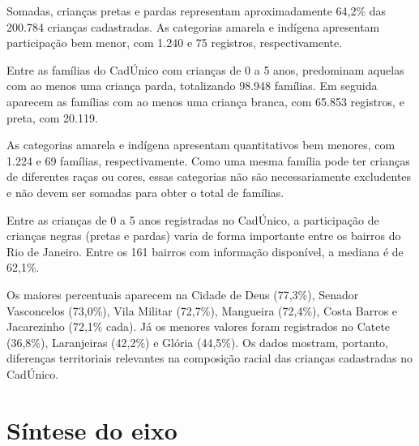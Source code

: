 Somadas, crianças pretas e pardas representam aproximadamente 64,2\% das 200.784 crianças cadastradas. As categorias amarela e indígena apresentam participação bem menor, com 1.240 e 75 registros, respectivamente.


Entre as famílias do CadÚnico com crianças de 0 a 5 anos, predominam aquelas com ao menos uma criança parda, totalizando 98.948 famílias. Em seguida aparecem as famílias com ao menos uma criança branca, com 65.853 registros, e preta, com 20.119.

As categorias amarela e indígena apresentam quantitativos bem menores, com 1.224 e 69 famílias, respectivamente. Como uma mesma família pode ter crianças de diferentes raças ou cores, essas categorias não são necessariamente excludentes e não devem ser somadas para obter o total de famílias.


Entre as crianças de 0 a 5 anos registradas no CadÚnico, a participação de crianças negras (pretas e pardas) varia de forma importante entre os bairros do Rio de Janeiro. Entre os 161 bairros com informação disponível, a mediana é de 62,1\%.

Os maiores percentuais aparecem na Cidade de Deus (77,3\%), Senador Vasconcelos (73,0\%), Vila Militar (72,7\%), Mangueira (72,4\%), Costa Barros e Jacarezinho (72,1\% cada). Já os menores valores foram registrados no Catete (36,8\%), Laranjeiras (42,2\%) e Glória (44,5\%). Os dados mostram, portanto, diferenças territoriais relevantes na composição racial das crianças cadastradas no CadÚnico.


\section{Síntese do eixo}

